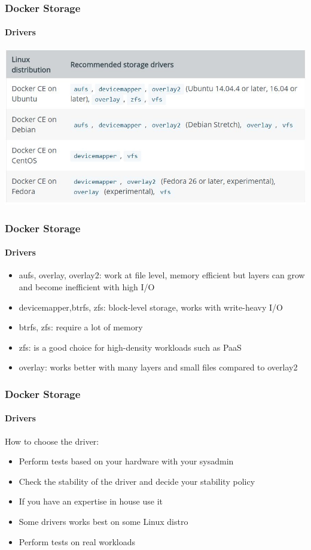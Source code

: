\begin{frame}
\frametitle{Docker Storage}
\framesubtitle{Drivers}
\includegraphics[width=1.0\columnwidth]{./Figure/docker-070-052}
\end{frame}

\begin{frame}
\frametitle{Docker Storage}
\framesubtitle{Drivers}
\begin{itemize}
\item aufs, overlay, overlay2: work at file level, memory efficient but layers can grow and become inefficient with high I/O
\item devicemapper,btrfs, zfs: block-level storage, works with write-heavy I/O
\item btrfs, zfs: require a lot of memory
\item zfs: is a good choice for high-density workloads such as PaaS
\item overlay: works better with many layers and small files compared to overlay2
\end{itemize}
\end{frame}


\begin{frame}
\frametitle{Docker Storage}
\framesubtitle{Drivers}

How to choose the driver:
\begin{itemize}
\item Perform tests based on your hardware with your sysadmin
\item Check the stability of the driver and decide your stability policy
\item If you have an expertise in house use it
\item Some drivers works best on some Linux distro
\item Perform tests on real workloads
\end{itemize}
\end{frame}

